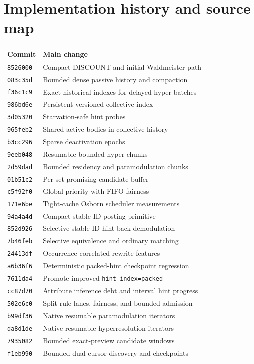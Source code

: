 \documentclass[11pt]{article}
\newcommand{\setting}[1]{\texttt{#1}}
\begin{document}
\section{Implementation history and source map}

\begin{center}
\begin{tabular}{ll}
\toprule
Commit & Main change \\
\midrule
\setting{8526000} & Compact DISCOUNT and initial Waldmeister path \\
\setting{083c35d} & Bounded dense passive history and compaction \\
\setting{f36c1c9} & Exact historical indexes for delayed hyper batches \\
\setting{986bd6e} & Persistent versioned collective index \\
\setting{3d05320} & Starvation-safe hint probes \\
\setting{965feb2} & Shared active bodies in collective history \\
\setting{b3cc296} & Sparse deactivation epochs \\
\setting{9eeb048} & Resumable bounded hyper chunks \\
\setting{2d59dad} & Bounded residency and paramodulation chunks \\
\setting{01b51c2} & Per-set promising candidate buffer \\
\setting{c5f92f0} & Global priority with FIFO fairness \\
\setting{171e6be} & Tight-cache Osborn scheduler measurements \\
\setting{94a4a4d} & Compact stable-ID posting primitive \\
\setting{852d926} & Selective stable-ID hint back-demodulation \\
\setting{7b46feb} & Selective equivalence and ordinary matching \\
\setting{24413df} & Occurrence-correlated rewrite features \\
\setting{a6b36f6} & Deterministic packed-hint checkpoint regression \\
\setting{7611da4} & Promote improved \setting{hint\_index=packed} \\
\setting{cc87d70} & Attribute inference debt and interval hint progress \\
\setting{502e6c0} & Split rule lanes, fairness, and bounded admission \\
\setting{b99df36} & Native resumable paramodulation iterators \\
\setting{da8d1de} & Native resumable hyperresolution iterators \\
\setting{7935082} & Bounded exact-preview candidate windows \\
\setting{f1eb990} & Bounded dual-cursor discovery and checkpoints \\
\bottomrule
\end{tabular}
\end{center}
\end{document}
